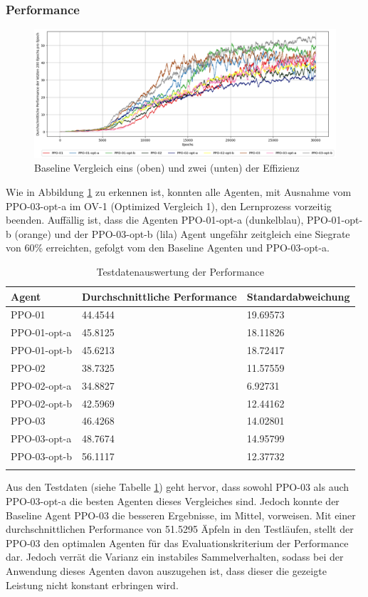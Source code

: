 \subsubsection{Performance}
\begin{figure}[H]
	\centering
	\includegraphics[scale=0.4517]{Abbildungen/Evaluation/optimized-performance.png}
	\caption[Optimized Vergleich Performance]{Baseline Vergleich eins (oben) und zwei (unten) der Effizienz}
	\label{fig:Optimized_Performance}
\end{figure}
Wie in Abbildung \ref{fig:Optimized_Performance} zu erkennen ist, konnten alle Agenten, mit Ausnahme vom PPO-03-opt-a im OV-1 (Optimized Vergleich 1), den Lernprozess vorzeitig beenden. Auffällig ist, dass die Agenten PPO-01-opt-a (dunkelblau), PPO-01-opt-b (orange) und der PPO-03-opt-b (lila) Agent  ungefähr zeitgleich eine Siegrate von 60\% erreichten, gefolgt vom den Baseline Agenten und PPO-03-opt-a.
\begin{longtable}[h]{|p{3.2cm}|p{6cm}|p{4cm}|}
	\hline
	Agent & Durchschnittliche Performance & Standardabweichung \\
	\hline
	PPO-01 & 44.4544 & 19.69573 \\ 
	\hline
	PPO-01-opt-a & 45.8125 & 18.11826 \\ 
	\hline
	PPO-01-opt-b & 45.6213 & 18.72417 \\ 
	\hline
	PPO-02 & 38.7325 & 11.57559 \\ 
	\hline
	PPO-02-opt-a & 34.8827 & 6.92731 \\ 
	\hline
	PPO-02-opt-b & 42.5969 & 12.44162 \\ 
	\hline
	PPO-03 & 46.4268 & 14.02801 \\ 
	\hline
	PPO-03-opt-a & 48.7674 & 14.95799 \\ 
	\hline
	PPO-03-opt-b & 56.1117 & 12.37732 \\ 
	\hline
	\caption{Testdatenauswertung der Performance}
	\label{tab:Evaluation_Testdaten_Performance_Optimized} 
\end{longtable}
Aus den Testdaten (siehe Tabelle \ref{tab:Evaluation_Testdaten_Performance_Optimized}) geht hervor, dass sowohl PPO-03 als auch PPO-03-opt-a die besten Agenten dieses Vergleiches sind. Jedoch konnte der Baseline Agent PPO-03 die besseren Ergebnisse, im Mittel, vorweisen. Mit einer durchschnittlichen Performance von 51.5295 Äpfeln in den Testläufen, stellt der PPO-03 den optimalen Agenten für das Evaluationskriterium der Performance dar. Jedoch verrät die Varianz ein instabiles Sammelverhalten, sodass bei der Anwendung dieses Agenten davon auszugehen ist, dass dieser die gezeigte Leistung nicht konstant erbringen wird.

